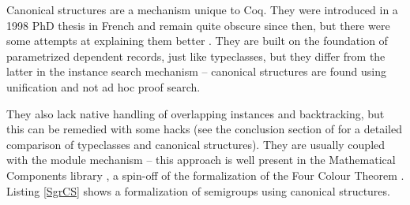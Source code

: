 \documentclass[declaration,inz,english,shortabstract]{iithesis}
\begin{document}

Canonical structures are a mechanism unique to Coq. They were introduced in a 1998 PhD thesis in French \cite{CanonicalStructures0} and remain quite obscure since then, but there were some attempts at explaining them better \cite{CanonicalStructures1} \cite{CanonicalStructures2} \cite{CanonicalStructures3}. They are built on the foundation of parametrized dependent records, just like typeclasses, but they differ from the latter in the instance search mechanism -- canonical structures are found using unification and not ad hoc proof search.

They also lack native handling of overlapping instances and backtracking, but this can be remedied with some hacks (see the conclusion section of \cite{CanonicalStructures2} for a detailed comparison of typeclasses and canonical structures). They are usually coupled with the module mechanism -- this approach is well present in the Mathematical Components library \cite{MCB}, a spin-off of the formalization of the Four Colour Theorem \cite{FourColour1} \cite{FourColour2}. Listing \ref{SgrCS} shows a formalization of semigroups using canonical structures.

\end{document}
